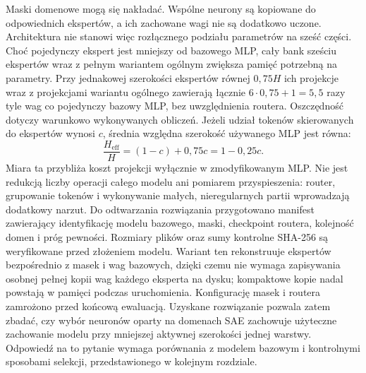 Maski domenowe mogą się nakładać. Wspólne neurony są kopiowane do odpowiednich ekspertów, a ich zachowane wagi nie są dodatkowo uczone. Architektura nie stanowi więc rozłącznego podziału parametrów na sześć części. Choć pojedynczy ekspert jest mniejszy od bazowego MLP, cały bank sześciu ekspertów wraz z pełnym wariantem ogólnym zwiększa pamięć potrzebną na parametry. Przy jednakowej szerokości ekspertów równej $0{,}75H$ ich projekcje wraz z projekcjami wariantu ogólnego zawierają łącznie $6\cdot0{,}75+1=5{,}5$ razy tyle wag co pojedynczy bazowy MLP, bez uwzględnienia routera. \newline
Oszczędność dotyczy warunkowo wykonywanych obliczeń. Jeżeli udział tokenów skierowanych do ekspertów wynosi $c$, średnia względna szerokość używanego MLP jest równa:
\[
\frac{H_{\mathrm{eff}}}{H}=(1-c)+0{,}75c=1-0{,}25c.
\]
Miara ta przybliża koszt projekcji wyłącznie w zmodyfikowanym MLP. Nie jest redukcją liczby operacji całego modelu ani pomiarem przyspieszenia: router, grupowanie tokenów i wykonywanie małych, nieregularnych partii wprowadzają dodatkowy narzut. \newline
Do odtwarzania rozwiązania przygotowano manifest zawierający identyfikację modelu bazowego, maski, checkpoint routera, kolejność domen i próg pewności. Rozmiary plików oraz sumy kontrolne SHA-256 są weryfikowane przed złożeniem modelu. Wariant ten rekonstruuje ekspertów bezpośrednio z masek i wag bazowych, dzięki czemu nie wymaga zapisywania osobnej pełnej kopii wag każdego eksperta na dysku; kompaktowe kopie nadal powstają w pamięci podczas uruchomienia. Konfigurację masek i routera zamrożono przed końcową ewaluacją. Uzyskane rozwiązanie pozwala zatem zbadać, czy wybór neuronów oparty na domenach SAE zachowuje użyteczne zachowanie modelu przy mniejszej aktywnej szerokości jednej warstwy. Odpowiedź na to pytanie wymaga porównania z modelem bazowym i kontrolnymi sposobami selekcji, przedstawionego w kolejnym rozdziale.
